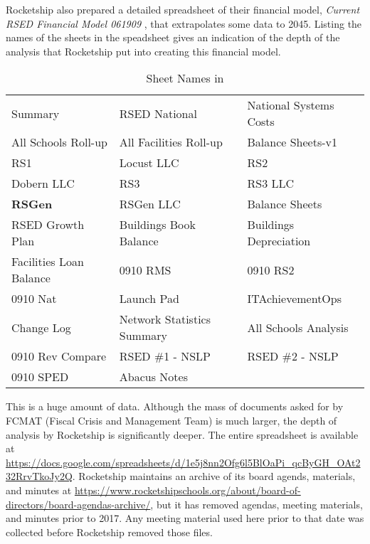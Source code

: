 Rocketship also prepared a detailed spreadsheet of their financial model, \textit{Current RSED Financial Model 061909} \parencite{RSED2009a}, that extrapolates some data to 2045. Listing the names of the sheets in the speadsheet gives an indication of the depth of the analysis that Rocketship put into creating this financial model. 
\begin{table}[ht]
  \caption{Sheet Names in \textcite{RSED2009a}}\label{tab:fin-model}
    \begin{tabular}{lll}
      Summary & RSED National & National Systems Costs \\
      All Schools Roll-up & All Facilities Roll-up & Balance Sheets-v1\\
      RS1 & Locust LLC & RS2 \\
      Dobern LLC & RS3 & RS3 LLC \\
      \textbf{RSGen} & RSGen LLC & Balance Sheets \\
      RSED Growth Plan & Buildings Book Balance & Buildings Depreciation \\
      Facilities Loan Balance & 0910 RMS & 0910 RS2 \\
      0910 Nat & Launch Pad & ITAchievementOps \\
      Change Log & Network Statistics Summary & All Schools Analysis\\
      0910 Rev Compare & RSED \#1  - NSLP & RSED \#2 - NSLP\\
      0910 SPED &  Abacus Notes \\
  \end{tabular}
\end{table}

This is a huge amount of data. Although the mass of documents asked for by FCMAT (Fiscal Crisis and Management Team) is much larger, the depth of analysis by Rocketship is significantly deeper. The entire spreadsheet is available at \url{https://docs.google.com/spreadsheets/d/1e5j8nn2Ofg6l5BlOaPi_qcByGH_OAt232RrvTkoJy2Q}. Rocketship maintains an archive of its board agends, materials, and minutes at \url{https://www.rocketshipschools.org/about/board-of-directors/board-agendas-archive/}, but it has removed agendas, meeting materials, and minutes prior to 2017. Any meeting material used here prior to that date was collected before Rocketship removed those files.

